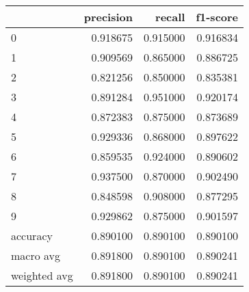 \begin{tabular}{lrrr}
\toprule
 & precision & recall & f1-score \\
\midrule
0 & 0.918675 & 0.915000 & 0.916834 \\
1 & 0.909569 & 0.865000 & 0.886725 \\
2 & 0.821256 & 0.850000 & 0.835381 \\
3 & 0.891284 & 0.951000 & 0.920174 \\
4 & 0.872383 & 0.875000 & 0.873689 \\
5 & 0.929336 & 0.868000 & 0.897622 \\
6 & 0.859535 & 0.924000 & 0.890602 \\
7 & 0.937500 & 0.870000 & 0.902490 \\
8 & 0.848598 & 0.908000 & 0.877295 \\
9 & 0.929862 & 0.875000 & 0.901597 \\
accuracy & 0.890100 & 0.890100 & 0.890100 \\
macro avg & 0.891800 & 0.890100 & 0.890241 \\
weighted avg & 0.891800 & 0.890100 & 0.890241 \\
\bottomrule
\end{tabular}
